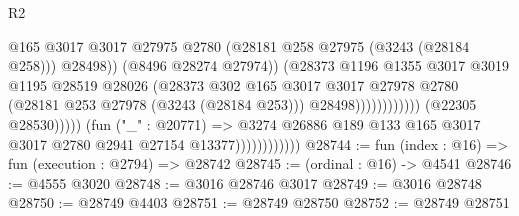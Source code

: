 \begin{lexlean}{R2}
\begin{coremodule}
                                                            @165
                                                            @3017
                                                            @3017
                                                            @27975
                                                            @2780
                                                            (@28181
                                                              @258
                                                              @27975
                                                              (@3243 (@28184 @258)))
                                                            @28498))
                                                        (@8496 @28274 @27974))
                                                      (@28373
                                                        @1196
                                                        @1355
                                                        @3017
                                                        @3019
                                                        @1195
                                                        @28519
                                                        @28026
                                                        (@28373
                                                          @302
                                                          @165
                                                          @3017
                                                          @3017
                                                          @27978
                                                          @2780
                                                          (@28181 @253 @27978 (@3243 (@28184 @253)))
                                                          @28498))))))))))))
                                  (@22305 @28530)))))
                          (fun ("_" : @20771) =>
                          @3274
                            @26886
                            @189
                            @133
                            @165
                            @3017
                            @3017
                            @2780
                            @2941
                            @27154
                            @13377))))))))))))
@28744 := fun (index : @16) => fun (execution : @2794) => @28742
@28745 := (ordinal : @16) -> @4541
@28746 := @4555 @3020
@28748 := @3016 @28746 @3017
@28749 := @3016 @28748
@28750 := @28749 @4403
@28751 := @28749 @28750
@28752 := @28749 @28751

\end{coremodule}
\end{lexlean}
